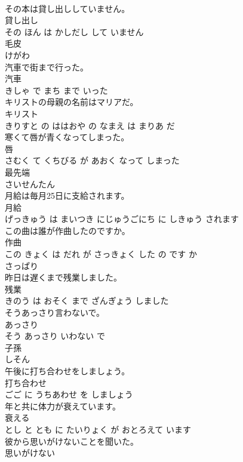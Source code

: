 \documentclass[8pt]{extreport}
\begin{document}
\begin{CJK}{UTF8}{min}
\\	その本は貸し出ししていません。	
\\	貸し出し 
\\	その ほん は かしだし して いません			
\\	毛皮	
\\	けがわ			
\\	汽車で街まで行った。	
\\	汽車 
\\	きしゃ で まち まで いった			
\\	キリストの母親の名前はマリアだ。	
\\	キリスト 
\\	きりすと の ははおや の なまえ は まりあ だ			
\\	寒くて唇が青くなってしまった。	
\\	唇 
\\	さむく て くちびる が あおく なって しまった			
\\	最先端	
\\	さいせんたん			
\\	月給は毎月25日に支給されます。	
\\	月給 
\\	げっきゅう は まいつき にじゅうごにち に しきゅう されます			
\\	この曲は誰が作曲したのですか。	
\\	作曲 
\\	この きょく は だれ が さっきょく した の です か			
\\	さっぱり	
\\	昨日は遅くまで残業しました。	
\\	残業 
\\	きのう は おそく まで ざんぎょう しました			
\\	そうあっさり言わないで。	
\\	あっさり 
\\	そう あっさり いわない で			
\\	子孫	
\\	しそん			
\\	午後に打ち合わせをしましょう。	
\\	打ち合わせ 
\\	ごご に うちあわせ を しましょう			
\\	年と共に体力が衰えています。	
\\	衰える 
\\	とし と とも に たいりょく が おとろえて います			
\\	彼から思いがけないことを聞いた。	
\\	思いがけない 

\end{CJK}
\end{document}
